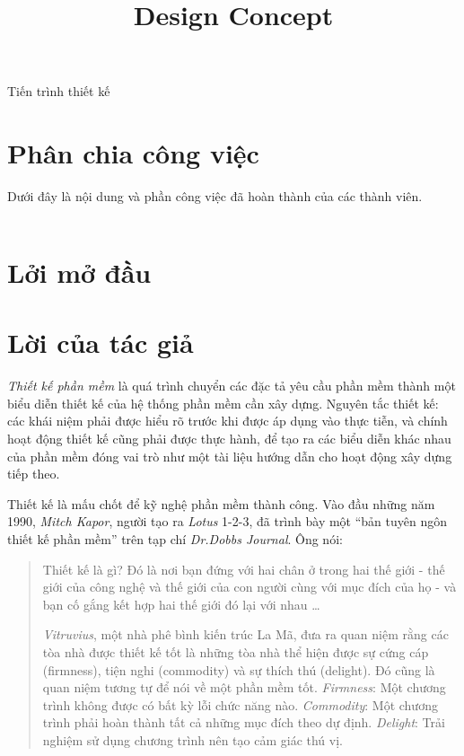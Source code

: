 \documentclass[12pt, a4paper]{article}
\title{Design Concept}
\begin{document}
	
	\clearpage
	
	\tableofcontents 
	\clearpage
	
	\listoffigures
	
	\listoftables
	Tiến trình thiết kế
	\printglossary[type=\acronymtype, title=Thuật ngữ viết tắt]
	\clearpage
	
	\section*{Phân chia công việc}
	Dưới đây là nội dung và phần công việc đã hoàn thành của các thành viên.
	
	\begin{tabular}{|c|c|l|c|}
		\hline 
	\end{tabular}
	
	\clearpage
	
	\section*{Lởi mở đầu}
	\clearpage
	
	\section*{Lời của tác giả}
	\textit{Thiết kế phần mềm}  là quá trình chuyển các đặc tả yêu cầu phần mềm thành một biểu diễn thiết kế của hệ thống phần mềm cần xây dựng. Nguyên tắc thiết kế: các khái niệm phải được hiểu rõ trước khi được áp dụng vào thực tiễn, và chính hoạt động thiết kế cũng phải được thực hành, để tạo ra các biểu diễn khác nhau của phần mềm đóng vai trò như một tài liệu hướng dẫn cho hoạt động xây dựng tiếp theo.
	
	Thiết kế là mấu chốt để kỹ nghệ phần mềm thành công. Vào đầu những năm 1990, \textit{ Mitch Kapor}, người tạo ra \textit{Lotus} 1-2-3, đã trình bày một “bản tuyên ngôn thiết kế phần mềm” trên tạp chí \textit{Dr.Dobbs Journal}. Ông nói:
	
	
	
	\begin{quotation}
	Thiết kế là gì? Đó là nơi bạn đứng với hai chân ở trong hai thế giới - thế giới của công nghệ và thế giới của con người  cùng với  mục đích của họ - và bạn cố gắng kết hợp hai thế giới đó lại với nhau \ldots
		
		
		\textit{Vitruvius}, một nhà phê bình kiến trúc La Mã, đưa ra quan niệm rằng các tòa nhà được thiết kế tốt là những tòa nhà thể hiện được sự cứng cáp (firmness), tiện nghi (commodity) và sự thích thú (delight). Đó cũng là quan niệm tương tự để nói về một phần mềm tốt.\textit{ Firmness}: Một chương trình không được có bất kỳ lỗi chức năng nào. \textit{Commodity}: Một chương trình phải hoàn thành tất cả những mục đích theo dự định. \textit{Delight}: Trải nghiệm sử dụng chương trình nên tạo cảm giác thú vị. 
	\end{quotation}	
	
\end{document}
